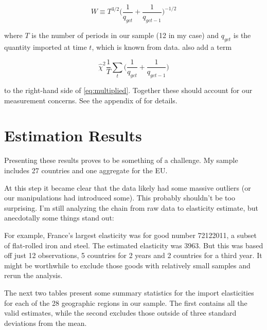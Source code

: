\documentclass[12pt,a4paper]{article}                      %
\begin{document}
\begin{equation}
    W \equiv T^{3/2}\Big(\frac{1}{q_{gct}} + \frac{1}{q_{gct - 1}})^{-1/2}
\end{equation}

where $T$ is the number of periods in our sample (12 in my case) and $q_{gct}$ is the quantity imported at time $t$, which is known from data.  \cite{broda_weinstein_2006_globalization_gains} also add a term

\begin{equation}
    \hat{\chi}^2 \frac{1}{T} \sum_t \big(\frac{1}{q_{gct}} + \frac{1}{q_{gct-1}})
\end{equation}

to the right-hand side of \ref{eq:multiplied}.  Together these should account for our measurement concerns.  See the appendix of \cite{broda_weinstein_2006_globalization_gains} for details.

\section{Estimation Results}
\label{sec:estimation_results}

Presenting these results proves to be something of a challenge.  My sample includes 27 countries and one aggregate for the EU.  

At this step it became clear that the data likely had some massive outliers (or our manipulations had introduced some).
This probably shouldn't be too surprising.
I'm still analyzing the chain from raw data to elasticity estimate, but anecdotally some things stand out:

For example, France's largest elasticity was for good number 72122011, a subset of flat-rolled iron and steel.  The estimated elasticity was 3963.  But this was based off just 12 observations, 5 countries for 2 years and 2 countries for a third year.
It might be worthwhile to exclude those goods with relatively small samples and rerun the analysis.

The next two tables present some summary statistics for the import elasticities for each of the 28 geographic regions in our sample.  The first contains all the valid estimates, while the second excludes those outside of three standard deviations from the mean.\\

\noindent
\label{tab:summary_stats}
\newpage

\noindent
\label{tab:inlier_summary_stats}
\end{document}
